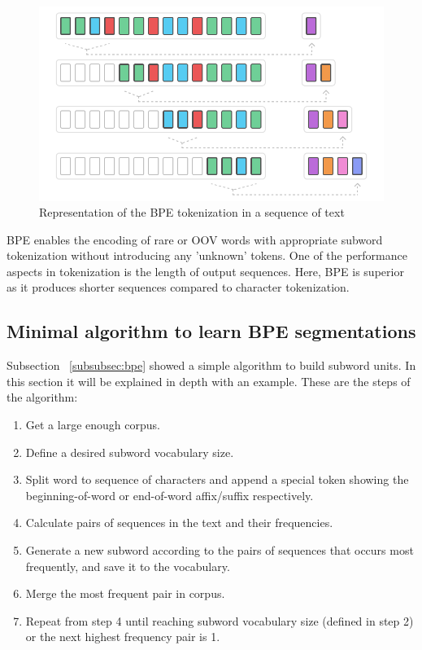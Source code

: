 \begin{figure}[!ht]
    \centering
    \includegraphics[width=14cm]{figures/bpe.png}
    \caption{Representation of the BPE tokenization in a sequence of text}
\end{figure}

BPE enables the encoding of rare or OOV words with appropriate subword tokenization without introducing any 'unknown' tokens. One of the performance aspects in tokenization is the length of output sequences. Here, BPE is superior as it produces shorter sequences compared to character tokenization.

\subsection{Minimal algorithm to learn BPE segmentations}

Subsection ~\ref{subsubsec:bpe} showed a simple algorithm to build subword units. In this section it will be explained in depth with an example. These are the steps of the algorithm:

\begin{enumerate}
    \item Get a large enough corpus.
    \item Define a desired subword vocabulary size.
    \item Split word to sequence of characters and append a special token showing the beginning-of-word or end-of-word affix/suffix respectively.
    \item Calculate pairs of sequences in the text and their frequencies.
    \item Generate a new subword according to the pairs of sequences that occurs most frequently, and save it to the vocabulary.
    \item Merge the most frequent pair in corpus.
    \item Repeat from step 4 until reaching subword vocabulary size (defined in step 2) or the next highest frequency pair is 1.
\end{enumerate}

